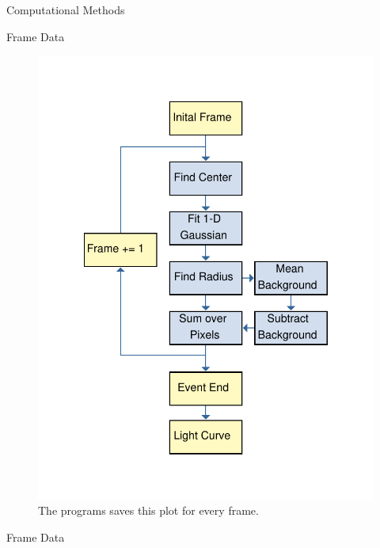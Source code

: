 \documentclass[final]{beamer}
\newlength{\onecolwid}
\begin{document}
\begin{frame}[t]
\begin{columns}[t]
\begin{column}{\onecolwid}
\begin{block}{Computational Methods}
\begin{alertblock}{Frame Data}
\end{alertblock}

\begin{figure}
\includegraphics[width=\linewidth]{flowchart.pdf}
\caption{The programs saves this plot for every frame.}
\end{figure}


\end{block}


\begin{alertblock}{Frame Data}


\end{alertblock}
\end{column}
\end{columns}
\end{frame}
\end{document}

